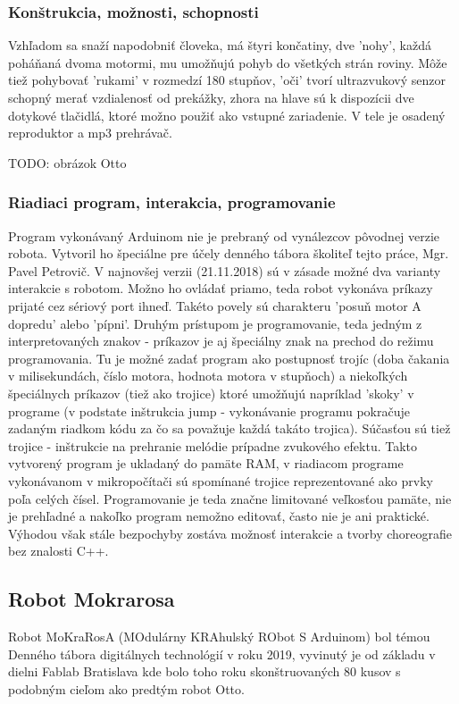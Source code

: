 \subsubsection{Konštrukcia, možnosti, schopnosti}
Vzhľadom sa snaží napodobniť človeka, má štyri končatiny, dve 'nohy', každá poháňaná dvoma motormi, mu umožňujú pohyb do všetkých strán roviny. Môže tiež pohybovať 'rukami' v rozmedzí 180 stupňov, 'oči' tvorí ultrazvukový senzor schopný merať vzdialenosť od prekážky, zhora na hlave sú k dispozícii dve dotykové tlačidlá, ktoré možno použiť ako vstupné zariadenie. V tele je osadený reproduktor a mp3 prehrávač.

TODO: obrázok Otto

\subsubsection{Riadiaci program, interakcia, programovanie}
Program vykonávaný Arduinom nie je prebraný od vynálezcov pôvodnej verzie robota. Vytvoril ho špeciálne pre účely denného tábora školiteľ tejto práce, Mgr. Pavel Petrovič. V najnovšej verzii (21.11.2018) sú v zásade možné dva varianty interakcie s robotom. Možno ho ovládať priamo, teda robot vykonáva príkazy prijaté cez sériový port ihneď. Takéto povely sú charakteru 'posuň motor A dopredu' alebo 'pípni'. Druhým prístupom je programovanie, teda jedným z interpretovaných znakov - príkazov je aj špeciálny znak na prechod do režimu programovania. Tu je možné zadať program ako postupnosť trojíc (doba čakania v milisekundách, číslo motora, hodnota motora v stupňoch) a niekoľkých špeciálnych príkazov (tiež ako trojice) ktoré umožňujú napríklad 'skoky' v programe (v podstate inštrukcia jump - vykonávanie programu pokračuje zadaným riadkom kódu za čo sa považuje každá takáto trojica). Súčasťou sú tiež trojice - inštrukcie na prehranie melódie prípadne zvukového efektu. Takto vytvorený program je ukladaný do pamäte RAM, v riadiacom programe vykonávanom v mikropočítači sú spomínané trojice reprezentované ako prvky poľa celých čísel. Programovanie je teda značne limitované veľkosťou pamäte, nie je prehľadné a nakoľko program nemožno editovať, často nie je ani praktické. Výhodou však stále bezpochyby zostáva možnosť interakcie a tvorby choreografie bez znalosti C++.


\subsection{Robot Mokrarosa}
Robot MoKraRosA (MOdulárny KRAhulský RObot S Arduinom) bol témou Denného tábora digitálnych technológií v roku 2019, vyvinutý je od základu v dielni Fablab Bratislava kde bolo toho roku skonštruovaných 80 kusov s podobným cieľom ako predtým robot Otto.

